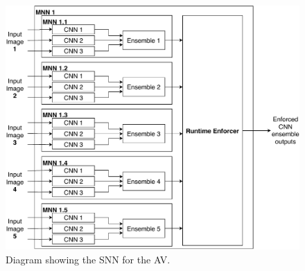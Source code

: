 \begin{figure}[b]
	\centering
	\includegraphics[width=\linewidth]{Content/fig/AV-MNN.pdf}
	\caption{Diagram showing the \ac{SNN} for the \ac{AV}. \label{fig:avmnn}}
\end{figure}










